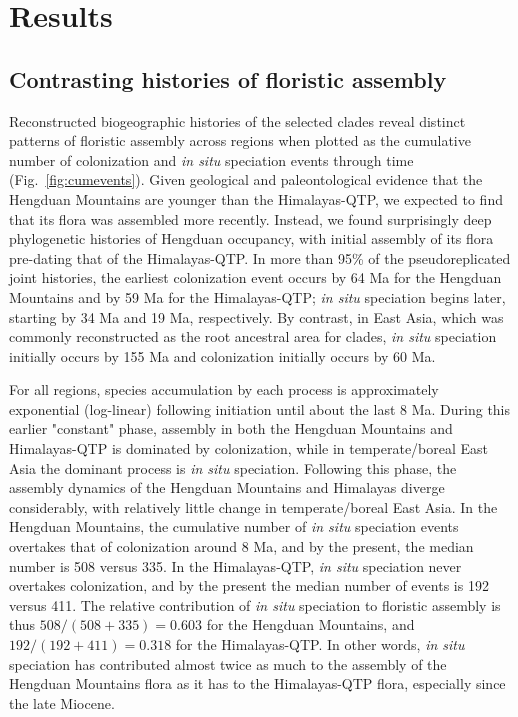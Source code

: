 \section*{Results}

\subsection*{Contrasting histories of floristic assembly}

Reconstructed biogeographic histories of the selected clades reveal
distinct patterns of floristic assembly across regions when plotted as
the cumulative number of colonization and \textit{in situ} speciation
events through time (Fig.~\ref{fig:cumevents}). Given geological and
paleontological evidence that the Hengduan Mountains are younger than
the Himalayas-QTP, we expected to find that its flora was assembled
more recently. Instead, we found surprisingly deep phylogenetic
histories of Hengduan occupancy, with initial assembly of its flora
pre-dating that of the Himalayas-QTP. In more than 95\% of the
pseudoreplicated joint histories, the earliest colonization event
occurs by 64 Ma for the Hengduan Mountains and by 59 Ma for the
Himalayas-QTP; \textit{in situ} speciation begins later, starting by
34 Ma and 19 Ma, respectively. By contrast, in East Asia, which was
commonly reconstructed as the root ancestral area for clades,
\textit{in situ} speciation initially occurs by 155 Ma and
colonization initially occurs by 60 Ma.

For all regions, species accumulation by each process is approximately
exponential (log-linear) following initiation until about the last 8
Ma. During this earlier "constant" phase, assembly in both the
Hengduan Mountains and Himalayas-QTP is dominated by colonization,
while in temperate/boreal East Asia the dominant process is \textit{in
  situ} speciation. Following this phase, the assembly dynamics of the
Hengduan Mountains and Himalayas diverge considerably, with relatively
little change in temperate/boreal East Asia. In the Hengduan
Mountains, the cumulative number of \textit{in situ} speciation events
overtakes that of colonization around 8 Ma, and by the present, the
median number is 508 versus 335. In the Himalayas-QTP, \textit{in
  situ} speciation never overtakes colonization, and by the present
the median number of events is 192 versus 411. The relative
contribution of \textit{in situ} speciation to floristic assembly is
thus $508/(508+335) = 0.603$ for the Hengduan Mountains, and
$192/(192+411) = 0.318$ for the Himalayas-QTP. In other words,
\textit{in situ} speciation has contributed almost twice as much to
the assembly of the Hengduan Mountains flora as it has to the
Himalayas-QTP flora, especially since the late Miocene.

